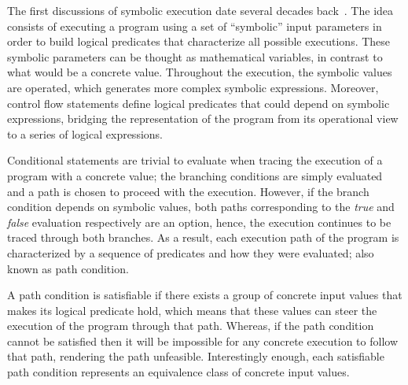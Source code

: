 

The first discussions of symbolic execution date several decades back~\cite{Hoare1969,King1976}. The idea consists of executing a program using a set of ``symbolic'' input parameters in order to build logical predicates that characterize all possible executions. These symbolic parameters can be thought as mathematical variables, in contrast to what would be a concrete value. Throughout the execution, the symbolic values are operated, which generates more complex symbolic expressions. Moreover, control flow statements define logical predicates that could depend on symbolic expressions, bridging the representation of the program from its operational view to a series of logical expressions. %

Conditional statements are trivial to evaluate when tracing the execution of a program with a concrete value; the branching conditions are simply evaluated and a path is chosen to proceed with the execution. However, if the branch condition depends on symbolic values, both paths corresponding to the \textit{true} and \textit{false} evaluation respectively are an option, hence, the execution continues to be traced through both branches. As a result, each execution path of the program is characterized by a sequence of predicates and how they were evaluated; also known as path condition.

A path condition is satisfiable if there exists a group of concrete input values that makes its logical predicate hold, which means that these values can steer the execution of the program through that path. Whereas, if the path condition cannot be satisfied then it will be impossible for any concrete execution to follow that path, rendering the path unfeasible. Interestingly enough, each satisfiable path condition represents an equivalence class of concrete input values. 

